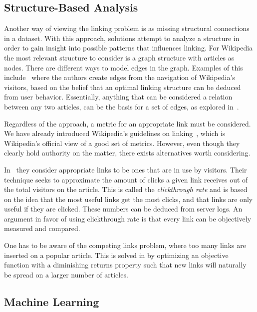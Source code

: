 \subsection{Structure-Based Analysis}\label{related_structural_analysis}
Another way of viewing the linking problem is as missing structural connections in a dataset. With this approach, solutions attempt to analyze a structure in order to gain insight into possible patterns that influences linking. For Wikipedia the most relevant structure to consider is a graph structure with articles as nodes. There are different ways to model edges in the graph. Examples of this include~\cite{hyperlink-structure-using-logs} where the authors create edges from the navigation of Wikipedia's visitors, based on the belief that an optimal linking structure can be deduced from user behavior. Essentially, anything that can be considered a relation between any two articles, can be the basis for a set of edges, as explored in~\cite{lu2011link}.

Regardless of the approach, a metric for an appropriate link must be considered. We have already introduced Wikipedia's guidelines on linking~\cite{wiki-editor-guidelines}, which is Wikipedia's official view of a good set of metrics. However, even though they clearly hold authority on the matter, there exists alternatives worth considering.

In~\cite{hyperlink-structure-using-logs} they consider appropriate links to be ones that are in use by visitors. Their technique seeks to approximate the amount of clicks a given link receives out of the total visitors on the article. This is called the \emph{clickthrough rate} and is based on the idea that the most useful links get the most clicks, and that links are only useful if they are clicked. These numbers can be deduced from server logs. An argument in favor of using clickthrough rate is that every link can be objectively measured and compared.

One has to be aware of the competing links problem, where too many links are inserted on a popular article. This is solved in \cite{hyperlink-structure-using-logs} by optimizing an objective function with a diminishing returns property such that new links will naturally be spread on a larger number of articles.

\subsection{Machine Learning}\label{related_machine_learning}

